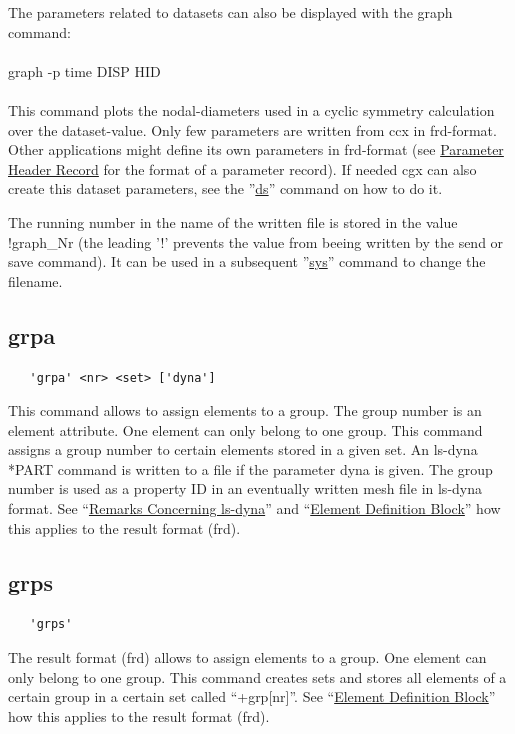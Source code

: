 \documentclass{article}
\providecommand{\htmlref}[2]{\hyperref[#2]{#1}}
\begin{document}
The parameters related to datasets can also be displayed with the graph command:\\\\graph -p time DISP HID\\\\This command plots the nodal-diameters used in a cyclic symmetry calculation over the dataset-value. Only few parameters are written from ccx in frd-format. Other applications might define its own parameters in frd-format (see \htmlref{Parameter Header Record}{Parameter Header Record} for the format of a parameter record). If needed cgx can also create this dataset parameters, see the ''\htmlref{ds}{ds}'' command on how to do it. 

The running number in the name of the written file is stored in the value !graph\_Nr (the leading '!' prevents the value from beeing written by the send or save command). It can be used in a subsequent ''\htmlref{sys}{sys}'' command to change the filename.

\subsection{\label{grpa}grpa}
\begin{verbatim}
   'grpa' <nr> <set> ['dyna']
\end{verbatim}
This command allows to assign elements to a group. The group number is an element attribute. One element can only belong to one group. This command assigns a group number to certain elements stored in a given set. An ls-dyna *PART command is written to a file if the parameter dyna is given. The group number is used as a property ID in an eventually written mesh file in ls-dyna format. See ``\htmlref{Remarks Concerning ls-dyna}{Remarks Concerning ls-dyna}'' and ``\htmlref{Element Definition Block}{Element Definition Block}'' how this applies to the result format (frd).

\subsection{\label{grps}grps}
\begin{verbatim}
   'grps'
\end{verbatim}
The result format (frd) allows to assign elements to a group. One element can only belong to one group. This command creates sets and stores all elements of a certain group in a certain set called ``+grp[nr]''. See ``\htmlref{Element Definition Block}{Element Definition Block}'' how this applies to the result format (frd).
\end{document}
